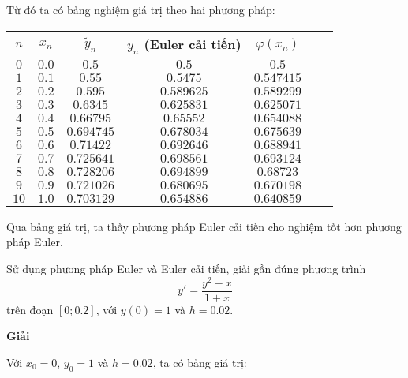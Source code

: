 Từ đó ta có bảng nghiệm giá trị theo hai phương pháp:\par
\begin{longtable}{|c|c|c|c|c|c|c|}\hline
	$n$  & $x_n$ & $\tilde{y}_n$ & $y_{n}$ (Euler cải tiến) & $\varphi(x_n)$ \\ \hline
	\endhead
	$0$  & $0.0$ & $0.5$         & $0.5$      & $0.5$      \\ \hline
	$1$  & $0.1$ & $0.55$        & $0.5475$   & $0.547415$ \\ \hline
	$2$  & $0.2$ & $0.595$       & $0.589625$ & $0.589299$ \\ \hline
	$3$  & $0.3$ & $0.6345$      & $0.625831$ & $0.625071$ \\ \hline
	$4$  & $0.4$ & $0.66795$     & $0.65552$  & $0.654088$ \\ \hline
	$5$  & $0.5$ & $0.694745$    & $0.678034$ & $0.675639$ \\ \hline
	$6$  & $0.6$ & $0.71422$     & $0.692646$ & $0.688941$ \\ \hline
	$7$  & $0.7$ & $0.725641$    & $0.698561$ & $0.693124$ \\ \hline
	$8$  & $0.8$ & $0.728206$    & $0.694899$ & $0.68723$  \\ \hline
	$9$  & $0.9$ & $0.721026$    & $0.680695$ & $0.670198$ \\ \hline
	$10$ & $1.0$ & $0.703129$    & $0.654886$ & $0.640859$ \\ \hline
\end{longtable}
Qua bảng giá trị, ta thấy phương pháp Euler cải tiến cho nghiệm tốt hơn phương pháp Euler.

\begin{example}
	Sử dụng phương pháp Euler và Euler cải tiến, giải gần đúng phương trình $$y'=\frac{y^2-x}{1+x}$$
	trên đoạn $[0;0.2]$, với $y(0)=1$ và $h=0.02$.
\end{example}

\textbf{Giải}\par
Với $x_0=0$, $y_0=1$ và $h=0.02$, ta có bảng giá trị:

